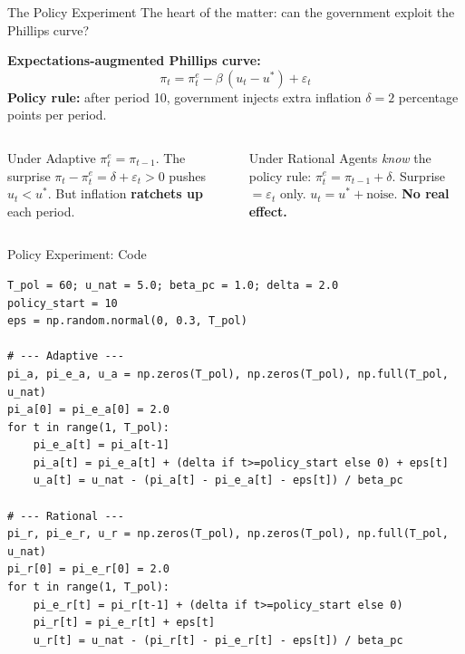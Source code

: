 \documentclass[aspectratio=169, 10pt]{beamer}
\begin{document}
\begin{frame}{The Policy Experiment}
The heart of the matter: can the government \alert{exploit the Phillips curve}?
\vspace{0.3em}

\textbf{Expectations-augmented Phillips curve:}
\[
  \pi_t = \pi^e_t - \beta\,(u_t - u^*) + \varepsilon_t
\]
\textbf{Policy rule:} after period 10, government injects extra inflation
$\delta = 2$ percentage points per period.
\vspace{0.3em}
\begin{columns}[T]
\begin{block}{Under Adaptive}
$\pi^e_t = \pi_{t-1}$. The surprise
$\pi_t - \pi^e_t = \delta + \varepsilon_t > 0$
pushes $u_t < u^*$. But inflation
\textbf{ratchets up} each period.
\end{block}
\begin{block}{Under Rational}
Agents \textit{know} the policy rule:
$\pi^e_t = \pi_{t-1} + \delta$.
Surprise $= \varepsilon_t$ only.
$u_t = u^* + \text{noise}$.
\textbf{No real effect.}
\end{block}
\end{columns}
\end{frame}

\begin{frame}[fragile]{Policy Experiment: Code}
\begin{lstlisting}
T_pol = 60; u_nat = 5.0; beta_pc = 1.0; delta = 2.0
policy_start = 10
eps = np.random.normal(0, 0.3, T_pol)

# --- Adaptive ---
pi_a, pi_e_a, u_a = np.zeros(T_pol), np.zeros(T_pol), np.full(T_pol, u_nat)
pi_a[0] = pi_e_a[0] = 2.0
for t in range(1, T_pol):
    pi_e_a[t] = pi_a[t-1]
    pi_a[t] = pi_e_a[t] + (delta if t>=policy_start else 0) + eps[t]
    u_a[t] = u_nat - (pi_a[t] - pi_e_a[t] - eps[t]) / beta_pc

# --- Rational ---
pi_r, pi_e_r, u_r = np.zeros(T_pol), np.zeros(T_pol), np.full(T_pol, u_nat)
pi_r[0] = pi_e_r[0] = 2.0
for t in range(1, T_pol):
    pi_e_r[t] = pi_r[t-1] + (delta if t>=policy_start else 0)
    pi_r[t] = pi_e_r[t] + eps[t]
    u_r[t] = u_nat - (pi_r[t] - pi_e_r[t] - eps[t]) / beta_pc
\end{lstlisting}
\end{frame}
\end{document}
